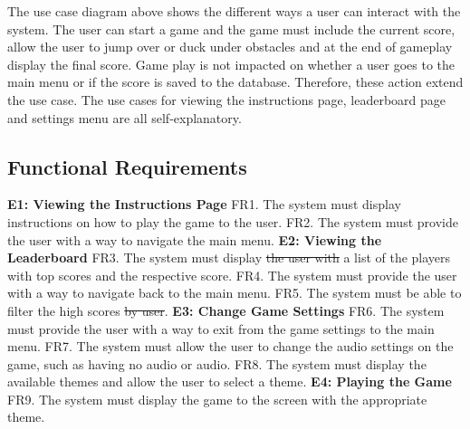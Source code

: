 \documentclass[12pt]{article}
\begin{document}
	The use case diagram above shows the different ways a user can interact with the system. The user can start a game and the game must include the current score, allow the user to jump over or duck under obstacles and at the end of gameplay display the final score. Game play is not impacted on whether a user goes to the main menu or if the score is saved to the database. Therefore, these action extend the use case. The use cases for viewing the instructions page, leaderboard page and settings menu are all self-explanatory. 
	
	
	
	\subsection{Functional Requirements}
	
	\textbf{E1: Viewing the Instructions Page} \newline
	FR1. The system must display instructions on how to play the game to the user. \newline
	FR2. The system must provide the user with a way to navigate the main menu. \newline \newline
	\textbf{E2: Viewing the Leaderboard} \newline
	FR3. The system must display \sout{ the user with} a list of the players with top scores and the respective score.  \newline
	FR4. The system must provide the user with a way to navigate back to the main menu. \newline
	FR5. The system must be able to filter the high scores \sout{by user}. \newline \newline
	\textbf{E3: Change Game Settings} \newline
	FR6. The system must provide the user with a way to exit from the game settings to the main menu. \newline
	FR7. The system must allow the user to change the audio settings on the game, such as having no audio or audio. \newline
	FR8. The system must display the available themes and allow the user to select a theme. \newline \newline
	\textbf{E4: Playing the Game} \newline
	FR9. The system must display the game to the screen with the appropriate theme. \newline
\end{document}

